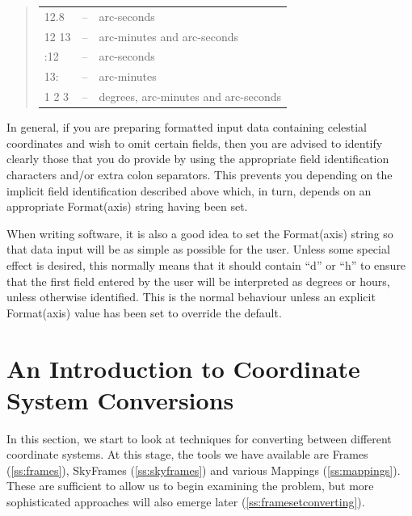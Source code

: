 \documentclass[twoside,11pt]{article}
\newcommand{\secref}[1]{\S\ref{#1}}
\renewcommand{\secref}[1]{\ref{#1}}
\begin{document}
\begin{quote}
\begin{tabular}{lll}
12.8 & -- & arc-seconds \\
12 13 & -- & arc-minutes and arc-seconds \\
:12 & -- & arc-seconds \\
13: & -- & arc-minutes \\
1 2 3 & -- & degrees, arc-minutes and arc-seconds
\end{tabular}
\end{quote}

In general, if you are preparing formatted input data containing
celestial coordinates and wish to omit certain fields, then you are
advised to identify clearly those that you do provide by using the
appropriate field identification characters and/or extra colon
separators. This prevents you depending on the implicit field
identification described above which, in turn, depends on an
appropriate Format(axis) string having been set.

When writing software, it is also a good idea to set the Format(axis)
string so that data input will be as simple as possible for the
user. Unless some special effect is desired, this normally means that
it should contain ``d'' or ``h'' to ensure that the first field
entered by the user will be interpreted as degrees or hours, unless
otherwise identified. This is the normal behaviour unless an explicit
Format(axis) value has been set to override the default.

%

\cleardoublepage
%
\section{\label{ss:introducingconversion}An Introduction to Coordinate System Conversions}

In this section, we start to look at techniques for converting between
different coordinate systems.  At this stage, the tools we have
available are Frames (\secref{ss:frames}), SkyFrames
(\secref{ss:skyframes}) and various Mappings
(\secref{ss:mappings}). These are sufficient to allow us to begin
examining the problem, but more sophisticated approaches will also
emerge later (\secref{ss:framesetconverting}).
\end{document}
